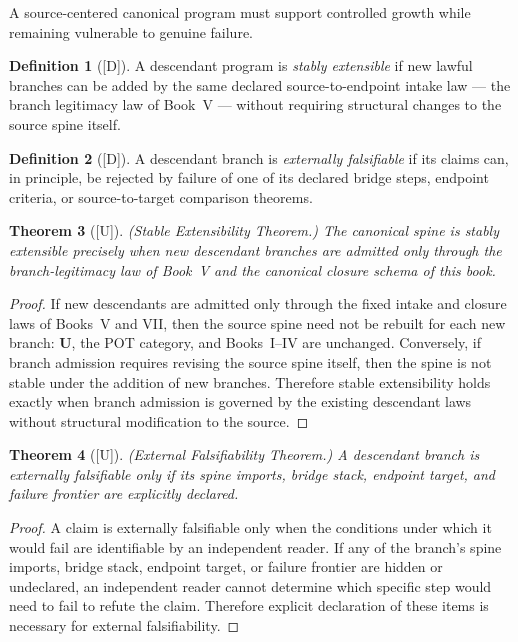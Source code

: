 \documentclass[12pt,oneside]{amsbook}
\theoremstyle{plain}
\newtheorem{theorem}{Theorem}[section]
\theoremstyle{definition}
\newtheorem{definition}[theorem]{Definition}
\theoremstyle{remark}
\newcommand{\status}[1]{\textup{[#1]}}
\begin{document}
A source-centered canonical program must support controlled growth
while remaining vulnerable to genuine failure.

\begin{definition}[\status{D}]\label{def:stably-extensible}
A descendant program is \emph{stably extensible} if new lawful
branches can be added by the same declared source-to-endpoint intake
law --- the branch legitimacy law of Book~V --- without requiring
structural changes to the source spine itself.
\end{definition}

\begin{definition}[\status{D}]\label{def:externally-falsifiable}
A descendant branch is \emph{externally falsifiable} if its claims
can, in principle, be rejected by failure of one of its declared
bridge steps, endpoint criteria, or source-to-target comparison
theorems.
\end{definition}

\begin{theorem}[\status{U}]\label{thm:stable-extensibility}
\textup{(Stable Extensibility Theorem.)}  The canonical spine is
stably extensible precisely when new descendant branches are admitted
only through the branch-legitimacy law of Book~V and the canonical
closure schema of this book.
\end{theorem}

\begin{proof}
If new descendants are admitted only through the fixed intake and
closure laws of Books~V and VII, then the source spine need not be
rebuilt for each new branch: $\mathbf{U}$, the POT category, and
Books~I--IV are unchanged.  Conversely, if branch admission requires
revising the source spine itself, then the spine is not stable under
the addition of new branches.  Therefore stable extensibility holds
exactly when branch admission is governed by the existing descendant
laws without structural modification to the source.
\end{proof}

\begin{theorem}[\status{U}]\label{thm:external-falsifiability}
\textup{(External Falsifiability Theorem.)}  A descendant branch is
externally falsifiable only if its spine imports, bridge stack,
endpoint target, and failure frontier are explicitly declared.
\end{theorem}

\begin{proof}
A claim is externally falsifiable only when the conditions under which
it would fail are identifiable by an independent reader.  If any of
the branch's spine imports, bridge stack, endpoint target, or failure
frontier are hidden or undeclared, an independent reader cannot
determine which specific step would need to fail to refute the claim.
Therefore explicit declaration of these items is necessary for
external falsifiability.
\end{proof}
\end{document}
